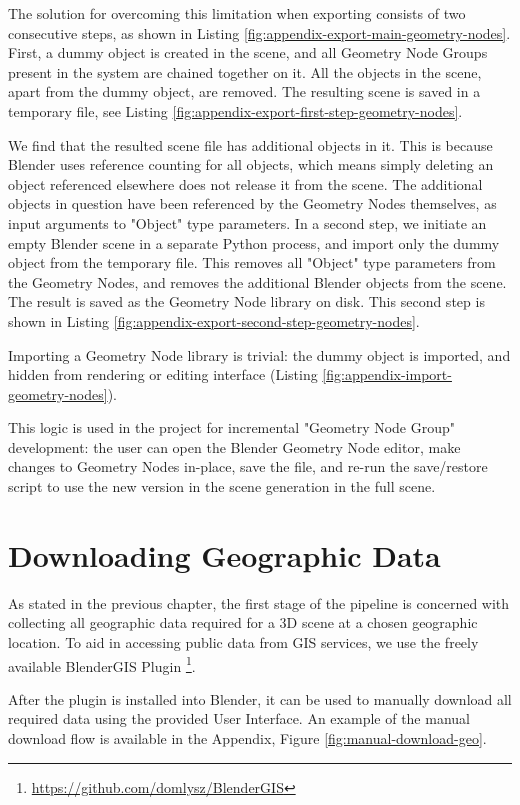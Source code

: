 The solution for overcoming this limitation when exporting consists of two consecutive steps, as shown in Listing \ref{fig:appendix-export-main-geometry-nodes}. First, a dummy object is created in the scene, and all Geometry Node Groups present in the system are chained together on it. All the objects in the scene, apart from the dummy object, are removed. The resulting scene is saved in a temporary file, see Listing \ref{fig:appendix-export-first-step-geometry-nodes}.

We find that the resulted scene file has additional objects in it. This is because Blender uses reference counting for all objects, which means simply deleting an object referenced elsewhere does not release it from the scene. The additional objects in question have been referenced by the Geometry Nodes themselves, as input arguments to "Object" type parameters. In a second step, we initiate an empty Blender scene in a separate Python process, and import only the dummy object from the temporary file. This removes all "Object" type parameters from the Geometry Nodes, and removes the additional Blender objects from the scene. The result is saved as the Geometry Node library on disk. This second step is shown in Listing \ref{fig:appendix-export-second-step-geometry-nodes}.

Importing a Geometry Node library is trivial: the dummy object is imported, and hidden from rendering or editing interface (Listing \ref{fig:appendix-import-geometry-nodes}).

This logic is used in the project for incremental "Geometry Node Group" development: the user can open the Blender Geometry Node editor, make changes to Geometry Nodes in-place, save the file, and re-run the save/restore script to use the new version in the scene generation in the full scene.

\section{Downloading Geographic Data}
\label{sec:dowonload-geo-data}

As stated in the previous chapter, the first stage of the pipeline is concerned with collecting all geographic data required for a 3D scene at a chosen geographic location. To aid in accessing public data from GIS services, we use the freely available BlenderGIS Plugin \footnote{\url{https://github.com/domlysz/BlenderGIS}}.

After the plugin is installed into Blender, it can be used to manually download all required data using the provided User Interface. An example of the manual download flow is available in the Appendix, Figure \ref{fig:manual-download-geo}.


